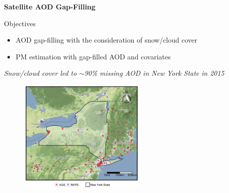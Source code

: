 \begin{frame}{}
\begin{center}
    \Large
    \textbf{Satellite AOD Gap-Filling}
\end{center}
\end{frame}

\begin{frame}{Objectives}
    \begin{itemize}
        \item AOD gap-filling with the consideration of snow/cloud cover
        \item PM estimation with gap-filled AOD and covariates
    \end{itemize}
    \begin{center}
        \small
        \textit{Snow/cloud cover led to $\sim$90\% missing AOD in New York State in 2015}
    \end{center}
    \begin{figure}
        \centering
        \includegraphics[width=0.55\textwidth]{img/ny.jpg}
        \label{fig:nys}
    \end{figure}
\end{frame}

